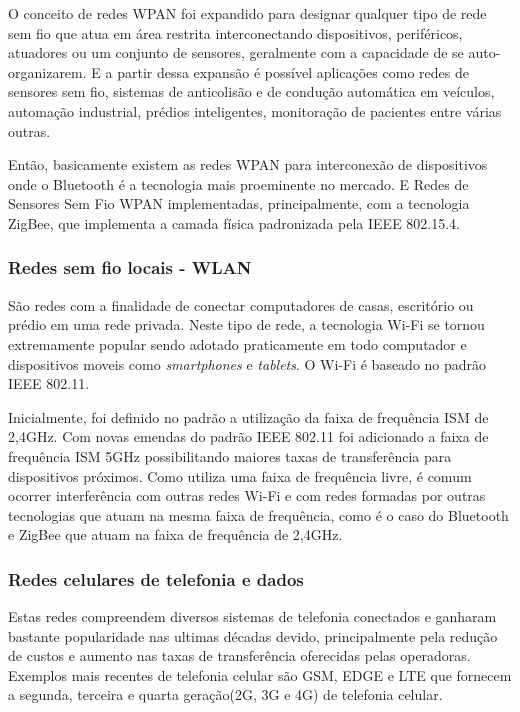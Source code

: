 O conceito de redes WPAN foi expandido para designar qualquer tipo de rede sem fio que atua em área restrita interconectando dispositivos, periféricos, atuadores ou um conjunto de sensores, geralmente com a capacidade de se auto-organizarem. E a partir dessa expansão é possível aplicações como redes de sensores sem fio, sistemas de anticolisão e de condução automática em veículos, automação industrial, prédios inteligentes, monitoração de pacientes entre várias outras.

Então, basicamente existem as redes WPAN para interconexão de dispositivos onde o Bluetooth é a tecnologia mais proeminente no mercado. E Redes de Sensores Sem Fio WPAN implementadas, principalmente, com a tecnologia ZigBee, que implementa a camada física padronizada pela IEEE 802.15.4.


\subsubsection*{Redes sem fio locais - WLAN}
São redes com a finalidade de conectar computadores de casas, escritório ou prédio em uma rede privada. Neste tipo de rede, a tecnologia Wi-Fi se tornou extremamente popular sendo adotado praticamente em todo computador e dispositivos moveis como \emph{smartphones} e \emph{tablets}. O Wi-Fi é baseado no padrão IEEE 802.11.

Inicialmente, foi definido no padrão a utilização da faixa de frequência ISM de 2,4GHz. Com novas emendas do padrão IEEE 802.11 foi adicionado a faixa de frequência ISM 5GHz possibilitando maiores taxas de transferência para dispositivos próximos. Como utiliza uma faixa de frequência livre, é comum ocorrer interferência com outras redes Wi-Fi e com redes formadas por outras tecnologias que atuam na mesma faixa de frequência, como é o caso do Bluetooth e ZigBee que atuam na faixa de frequência de 2,4GHz.

\subsubsection*{Redes celulares de telefonia e dados}
Estas redes compreendem diversos sistemas de telefonia conectados e ganharam bastante popularidade nas ultimas décadas devido, principalmente pela redução de custos e aumento nas taxas de transferência oferecidas pelas operadoras. Exemplos mais recentes de telefonia celular são GSM, EDGE e LTE que fornecem a segunda, terceira e quarta geração(2G, 3G e 4G) de telefonia celular.


